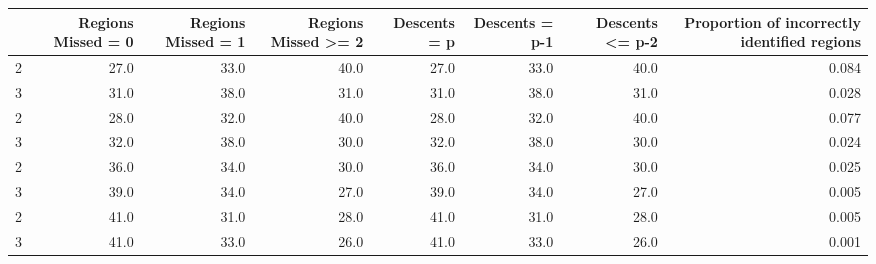 \begin{tabular}{lrrrrrrr}
\toprule
{} &  Regions Missed = 0 &  Regions Missed = 1 &  Regions Missed >= 2 &  Descents = p &  Descents = p-1 &  Descents <= p-2 &  Proportion of incorrectly identified regions \\
\midrule
2 &                27.0 &                33.0 &                 40.0 &          27.0 &            33.0 &             40.0 &                                         0.084 \\
3 &                31.0 &                38.0 &                 31.0 &          31.0 &            38.0 &             31.0 &                                         0.028 \\
2 &                28.0 &                32.0 &                 40.0 &          28.0 &            32.0 &             40.0 &                                         0.077 \\
3 &                32.0 &                38.0 &                 30.0 &          32.0 &            38.0 &             30.0 &                                         0.024 \\
2 &                36.0 &                34.0 &                 30.0 &          36.0 &            34.0 &             30.0 &                                         0.025 \\
3 &                39.0 &                34.0 &                 27.0 &          39.0 &            34.0 &             27.0 &                                         0.005 \\
2 &                41.0 &                31.0 &                 28.0 &          41.0 &            31.0 &             28.0 &                                         0.005 \\
3 &                41.0 &                33.0 &                 26.0 &          41.0 &            33.0 &             26.0 &                                         0.001 \\
\bottomrule
\end{tabular}
